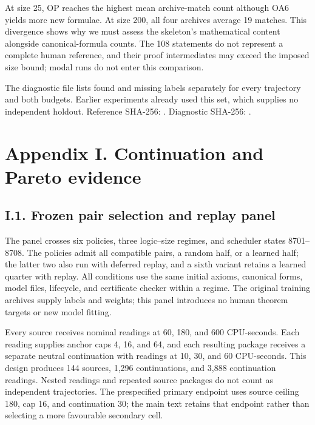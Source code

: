\documentclass[pdflatex,sn-basic,Numbered]{sn-jnl}
\begin{document}
\endgroup

At size 25, OP reaches the highest mean archive-match count although OA6 yields more new formulae. At size 200, all four archives average 19 matches. This divergence shows why we must assess the skeleton's mathematical content alongside canonical-formula counts. The 108 statements do not represent a complete human reference, and their proof intermediates may exceed the imposed size bound; modal runs do not enter this comparison.

The diagnostic file lists found and missing labels separately for every trajectory and both budgets. Earlier experiments already used this set, which supplies no independent holdout. Reference SHA-256: . Diagnostic SHA-256: .

\section*{Appendix I. Continuation and Pareto evidence}\label{appendix-i.-continuation-and-pareto-evidence}

\subsection*{I.1. Frozen pair selection and replay panel}\label{i.1.-frozen-pair-selection-and-replay-panel}

The panel crosses six policies, three logic--size regimes, and scheduler states 8701--8708. The policies admit all compatible pairs, a random half, or a learned half; the latter two also run with deferred replay, and a sixth variant retains a learned quarter with replay. All conditions use the same initial axioms, canonical forms, model files, lifecycle, and certificate checker within a regime. The original training archives supply labels and weights; this panel introduces no human theorem targets or new model fitting.

Every source receives nominal readings at 60, 180, and 600 CPU-seconds. Each reading supplies anchor caps 4, 16, and 64, and each resulting package receives a separate neutral continuation with readings at 10, 30, and 60 CPU-seconds. This design produces 144 sources, 1,296 continuations, and 3,888 continuation readings. Nested readings and repeated source packages do not count as independent trajectories. The prespecified primary endpoint uses source ceiling 180, cap 16, and continuation 30; the main text retains that endpoint rather than selecting a more favourable secondary cell.
\end{document}
